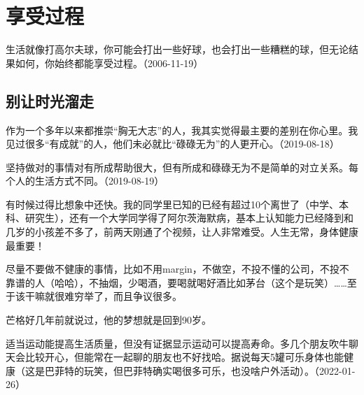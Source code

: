 
\section{享受过程}

生活就像打高尔夫球，你可能会打出一些好球，也会打出一些糟糕的球，但无论结果如何，你始终都能享受过程。（2006-11-19）

\subsection{别让时光溜走}


作为一个多年以来都推崇“胸无大志”的人，我其实觉得最主要的差别在你心里。我见过很多“有成就”的人，他们未必就比“碌碌无为”的人更开心。（2019-08-18）


坚持做对的事情对有所成帮助很大，但有所成和碌碌无为不是简单的对立关系。每个人的生活方式不同。（2019-08-19）


有时候过得比想象中还快。我的同学里已知的已经有超过10个离世了（中学、本科、研究生），还有一个大学同学得了阿尔茨海默病，基本上认知能力已经降到和几岁的小孩差不多了，前两天刚通了个视频，让人非常难受。人生无常，身体健康最重要！


尽量不要做不健康的事情，比如不用margin，不做空，不投不懂的公司，不投不靠谱的人（哈哈），不抽烟，少喝酒，要喝就喝好酒比如茅台（这个是玩笑）……至于该干嘛就很难穷举了，而且争议很多。


芒格好几年前就说过，他的梦想就是回到90岁。

适当运动能提高生活质量，但没有证据显示运动可以提高寿命。多几个朋友吹牛聊天会比较开心，但能常在一起聊的朋友也不好找哈。据说每天5罐可乐身体也能健康（这是巴菲特的玩笑，但巴菲特确实喝很多可乐，也没啥户外活动）。（2022-01-26）


